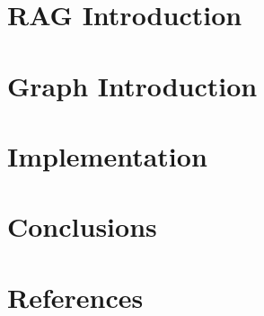 \section[RAG]{RAG Introduction}


\section[GraphRAG]{Graph Introduction}





\section[Impl]{Implementation}






\section[Conclusion]{Conclusions}


\section[Refs]{References}
